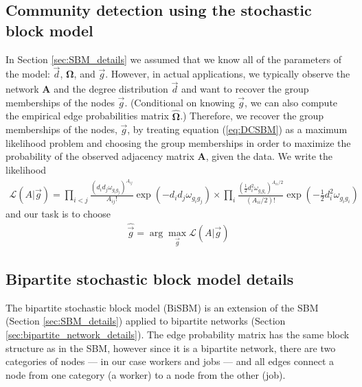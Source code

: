 \documentclass[12pt]{article}
\theoremstyle{definition}
\theoremstyle{plain}
\begin{document}
\subsection{Community detection using the stochastic block model}

In Section \ref{sec:SBM_details} we assumed that we know all of the parameters of the model: $\vec{d}$,  $\mathbf{\Omega}$, and $\vec{g}$. However, in actual applications, we typically observe the network $\mathbf{A}$ and the degree distribution $\vec{d}$ and want to recover the group memberships of the nodes $\vec{g}$. (Conditional on knowing $\vec{g}$, we can also compute the empirical edge probabilities matrix $ \mathbf{\hat\Omega}$.)  Therefore, we recover the group memberships of the nodes, $\vec{g}$, by treating equation (\ref{eq:DCSBM}) as a maximum likelihood problem and choosing the group memberships in order to maximize the probability of the observed adjacency matrix $\mathbf{A}$, given the data. We write the likelihood
\begin{align}
\mathcal{L}(A|\vec{g}) = \prod_{i < j} \frac{(d_id_j\omega_{g_ig_j})^{A_{ij}}}{A_{ij}!} \exp \left( -d_id_j\omega_{g_ig_j}\right) \times \prod_i \frac{(\frac{1}{2}d_i^2\omega_{g_ig_i})^{A_{ii}/2}}{(A_{ii}/2)!} \exp \left( -\frac{1}{2}d_i^2\omega_{g_ig_i}\right)
\end{align}
and our task is to choose
\begin{align*}
\hat{\vec{g}} = \arg\max_{\vec{g}} \mathcal{L}(A|\vec{g}) 
\end{align*}

\subsection{Bipartite stochastic block model details}

The bipartite stochastic block model (BiSBM) is an extension of the SBM (Section \ref{sec:SBM_details}) applied to bipartite networks (Section \ref{sec:bipartite_network_details}). The edge probability matrix has the same block structure as in the SBM, however since it is a bipartite network, there are two categories of nodes --- in our case workers and jobs --- and all edges connect a node from one category (a worker) to a node from the other (job).
\end{document}
